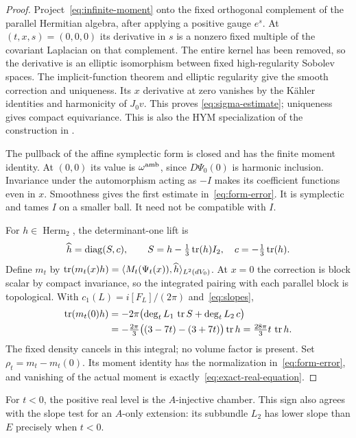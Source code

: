 \begin{proof}
Project~\eqref{eq:infinite-moment} onto the fixed orthogonal complement
of the parallel Hermitian algebra, after applying a positive gauge
$e^s$. At $(t,x,s)=(0,0,0)$ its derivative in $s$ is a nonzero fixed
multiple of the covariant Laplacian on that complement. The entire
kernel has been removed, so the derivative is an elliptic isomorphism
between fixed high-regularity Sobolev spaces. The implicit-function
theorem and elliptic regularity give the smooth correction and
uniqueness. Its $x$ derivative at zero vanishes by the K\"ahler
identities and harmonicity of $J_0v$. This proves
\eqref{eq:sigma-estimate}; uniqueness gives compact equivariance.
This is also the HYM specialization of the construction in
\cite[Proposition~4.5]{Del25}.

The pullback of the affine symplectic form is closed and has the
finite moment identity. At $(0,0)$ its value is
$\omega^{\rm amb}$, since $D\Psi_0(0)$ is harmonic inclusion.
Invariance under the automorphism acting as $-I$ makes its
coefficient functions even in $x$. Smoothness gives the first
estimate in~\eqref{eq:form-error}. It is symplectic and tames $I$
on a smaller ball. It need not be compatible with $I$.

For $h\in\operatorname{Herm}_2$, the determinant-one lift is
\begin{equation}\label{eq:det-lift}
\widehat h=\operatorname{diag}(S,c),\qquad
S=h-\tfrac13\operatorname{tr}(h)I_2,\quad c=-\tfrac13\operatorname{tr}(h).
\end{equation}
Define $m_t$ by
$\operatorname{tr}(m_t(x)h)=\langle M_t(\Psi_t(x)),\widehat h\rangle_{L^2(dV_0)}$.
At $x=0$ the correction is block scalar by compact invariance, so the
integrated pairing with each parallel block is topological. With
$c_1(L)=i[F_L]/(2\pi)$ and~\eqref{eq:slopes},
\begin{align*}
\operatorname{tr}(m_t(0)h)
&=-2\pi\bigl(\deg_tL_1\,\operatorname{tr} S+\deg_tL_2\,c\bigr)\\
&=-\tfrac{2\pi}{3}\bigl((3-7t)-(3+7t)\bigr)\operatorname{tr} h
=\tfrac{28\pi}{3}t\,\operatorname{tr} h.
\end{align*}
The fixed density cancels in this integral; no volume factor is
present. Set $\rho_t=m_t-m_t(0)$. Its moment identity has the
normalization in~\eqref{eq:form-error}, and vanishing of the actual
moment is exactly~\eqref{eq:exact-real-equation}.
\end{proof}

For $t<0$, the positive real level is the $A$-injective chamber.
This sign also agrees with the slope test for an $A$-only extension:
its subbundle $L_2$ has lower slope than $E$ precisely when $t<0$.
